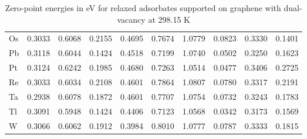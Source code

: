 \begin{table}[h]
{\begin{tabular}{*{10}{l}}
      Os & 0.3033 & 0.6068 & 0.2155 & 0.4695 & 0.7674 & 1.0779 & 0.0823 & 0.3330 & 0.1401 \\
      Pb & 0.3118 & 0.6044 & 0.1424 & 0.4518 & 0.7199 & 1.0740 & 0.0502 & 0.3250 & 0.1623 \\
      Pt & 0.3124 & 0.6242 & 0.1985 & 0.4680 & 0.7263 & 1.0514 & 0.0477 & 0.3406 & 0.2725 \\
      Re & 0.3033 & 0.6034 & 0.2108 & 0.4601 & 0.7864 & 1.0807 & 0.0780 & 0.3317 & 0.2191 \\
      Ta & 0.2938 & 0.6078 & 0.1872 & 0.4601 & 0.7707 & 1.0754 & 0.0732 & 0.3243 & 0.1783 \\
      Tl & 0.3091 & 0.5948 & 0.1424 & 0.4406 & 0.7123 & 1.0568 & 0.0342 & 0.3173 & 0.1569 \\
      W  & 0.3066 & 0.6062 & 0.1912 & 0.3984 & 0.8010 & 1.0777 & 0.0787 & 0.3333 & 0.1815 \\
      \hline
  \end{tabular}
  }
  \caption{Zero-point energies in eV for relaxed adsorbates supported on graphene with dual-vacancy at 298.15 K}
  \label{si_table11:zpe_vac_gra}
\end{table}


